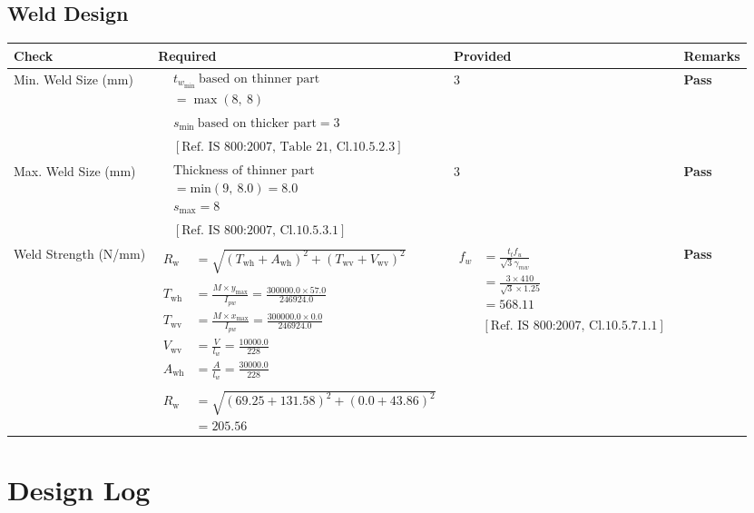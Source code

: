 \documentclass{article}%
\begin{document}
\subsection{Weld Design}%
\label{subsec:WeldDesign}%
\renewcommand{\arraystretch}{1.2}%
\begin{longtable}{|p{3.5cm}|p{6.5cm}|p{4.5cm}|p{1.5cm}|}%
\hline%
\rowcolor{OsdagGreen}%
Check&Required&Provided&Remarks\\%
\hline%
\endhead%
\hline%
Min. Weld Size (mm)&$\begin{aligned} & t_{w_{\text{min}}}~ \text{based on thinner part} \\ & = \max (8,~ 8) \\ \\ & s_{\text{min}}~ \text{based on thicker part} =3\\ \\ & [\text{Ref. IS 800:2007, Table 21, Cl.10.5.2.3}] \end{aligned}$&3&\textcolor{OsdagGreen}{ 
\textbf{Pass}
}\\%
\hline%
Max. Weld Size (mm)&$\begin{aligned} & \text{Thickness of thinner part} \\ &= \text{min} (9,~8.0)=8.0\\ &s_{\text{max}} =8\\ \\ & [\text{Ref. IS 800:2007, Cl.10.5.3.1}] \end{aligned}$&3&\textcolor{OsdagGreen}{ 
\textbf{Pass}
}\\%
\hline%
Weld Strength (N/mm)&$\begin{aligned} R_{\text{w}} &=\sqrt{(T_{\text{wh}}+A_{\text{wh}})^2 + (T_{\text{wv}}+V_{\text{wv}})^2}\\ \\ T_{\text{wh}}&=\frac{M\times y_{\text{max}}}{I_{pw}}=\frac{300000.0\times57.0}{246924.0}\\ T_{\text{wv}}&=\frac{M\times x_{\text{max}}}{I_{pw}}=\frac{300000.0\times0.0}{246924.0}\\ V_{\text{wv}}&=\frac{V}{l_w}=\frac{10000.0}{228}\\ A_{\text{wh}}&=\frac{A}{l_w}=\frac{30000.0}{228}\\ \\ R_{\text{w}}&=\sqrt{(69.25+131.58)^2 + (0.0+43.86)^2}\\  &=205.56\end{aligned}$&$\begin{aligned} f_w &=\frac{t_t f_u}{\sqrt{3} \gamma_{mw}}\\ &=\frac{3\times410}{\sqrt{3}\times1.25}\\ &=568.11\\ \\ & [ \text{Ref. IS 800:2007, Cl.10.5.7.1.1}] \end{aligned}$&\textcolor{OsdagGreen}{ 
\textbf{Pass}
}\\%
\hline%
\end{longtable}

%
\section{Design Log}%
\label{sec:DesignLog}%

%
\end{document}
